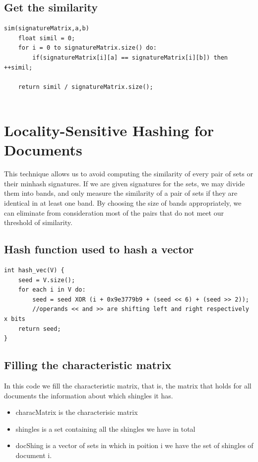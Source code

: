 \documentclass[12pt]{article}
\begin{document}
\subsection{Get the similarity}
\begin{lstlisting}
sim(signatureMatrix,a,b)
    float simil = 0;
    for i = 0 to signatureMatrix.size() do:
        if(signatureMatrix[i][a] == signatureMatrix[i][b]) then ++simil;
 
    return simil / signatureMatrix.size();


\end{lstlisting}


\section{Locality-Sensitive Hashing for Documents}
 This technique allows us to avoid computing the similarity of every pair of sets or their minhash signatures. If we are given signatures for the sets, we may divide them into bands, and only measure the similarity of a pair of sets if they are identical in at least one band. By choosing the size of bands appropriately, we can eliminate from consideration most of the pairs that do not meet our threshold of similarity.
 \medskip 
 
\subsection{Hash function used to hash a vector}
 \begin{lstlisting}
int hash_vec(V) {
	seed = V.size();
	for each i in V do:
		seed = seed XOR (i + 0x9e3779b9 + (seed << 6) + (seed >> 2));
		//operands << and >> are shifting left and right respectively x bits
	return seed;
}

\end{lstlisting}
 \medskip 

\subsection{Filling the characteristic matrix}
In this code we fill the characteristic matrix, that is, the matrix that holds for all documents the information about which shingles it has.
\begin{itemize}
\item characMatrix is the characterisic matrix
\item shingles is a set containing all the shingles we have in total
\item docShing is a vector of sets in which in poition i we have the set of shingles of document i. 
\end{itemize}
\end{document}
